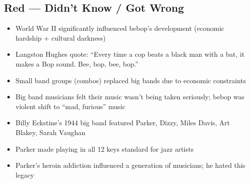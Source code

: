 \documentclass[11pt, letterpaper]{article}
\begin{document}
\subsection*{\textcolor{redzone}{Red --- Didn't Know / Got Wrong}}
\begin{itemize}[label=$\square$]
    \item World War II significantly influenced bebop's development (economic hardship + cultural darkness)
    \item Langston Hughes quote: ``Every time a cop beats a black man with a bat, it makes a Bop sound. Bee, bop, bee, bop.''
    \item Small band groups (combos) replaced big bands due to economic constraints
    \item Big band musicians felt their music wasn't being taken seriously; bebop was violent shift to ``mad, furious'' music
    \item Billy Eckstine's 1944 big band featured Parker, Dizzy, Miles Davis, Art Blakey, Sarah Vaughan
    \item Parker made playing in all 12 keys standard for jazz artists
    \item Parker's heroin addiction influenced a generation of musicians; he hated this legacy
\end{itemize}
\end{document}
